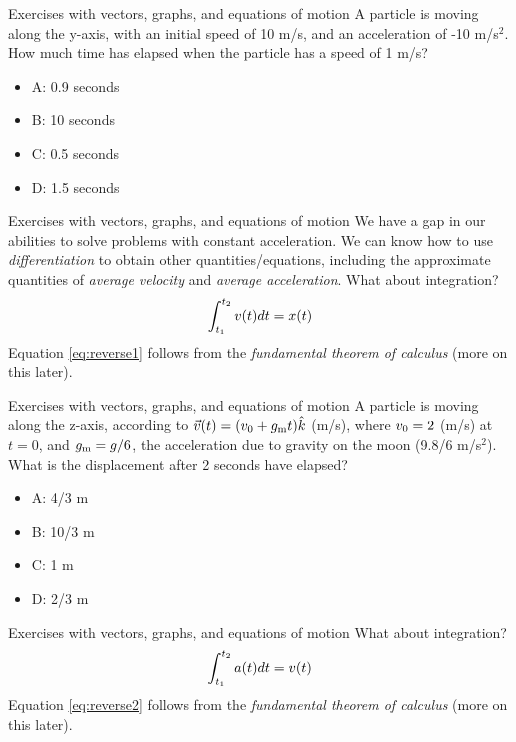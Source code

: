 \documentclass{beamer}
\begin{document}
\begin{frame}{Exercises with vectors, graphs, and equations of motion}
A particle is moving along the y-axis, with an initial speed of 10 m/s, and an acceleration of -10 m/s$^2$.  How much time has elapsed when the particle has a speed of 1 m/s?\\
\begin{itemize}
\item A: 0.9 seconds
\item B: 10 seconds
\item C: 0.5 seconds
\item D: 1.5 seconds
\end{itemize}
\end{frame}

\begin{frame}{Exercises with vectors, graphs, and equations of motion}
We have a gap in our abilities to solve problems with constant acceleration.  We can know how to use \textit{differentiation} to obtain other quantities/equations, including the approximate quantities of \textit{average velocity} and \textit{average acceleration}.  What about integration? \\
\begin{equation}
\int_{t_{\rm 1}}^{t_{\rm 2}} v(t) dt = x(t)
\label{eq:reverse1}
\end{equation}
Equation \ref{eq:reverse1} follows from the \textit{fundamental theorem of calculus} (more on this later).
\end{frame}

\begin{frame}{Exercises with vectors, graphs, and equations of motion}
A particle is moving along the z-axis, according to $\vec{v}(t) = (v_{\rm 0}+g_{\rm m}t) \hat{k}$ (m/s), where $v_{\rm 0} = 2$ (m/s) at $t=0$, and $g_{\rm m} = g/6$, the acceleration due to gravity on the moon (9.8/6 m/s$^2$). What is the displacement after 2 seconds have elapsed?\\
\begin{itemize}
\item A: 4/3 m
\item B: 10/3 m
\item C: 1 m
\item D: 2/3 m
\end{itemize}
\end{frame}

\begin{frame}{Exercises with vectors, graphs, and equations of motion}
What about integration? \\
\begin{equation}
\int_{t_{\rm 1}}^{t_{\rm 2}} a(t) dt = v(t)
\label{eq:reverse2}
\end{equation}
Equation \ref{eq:reverse2} follows from the \textit{fundamental theorem of calculus} (more on this later).
\end{frame}
\end{document}
